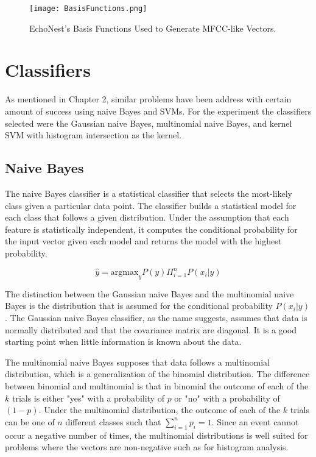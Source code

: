 \begin{figure}[h!]
  \centering
      \texttt{[image: BasisFunctions.png]}
  \caption[Compact Routing Example]%
    {EchoNest's Basis Functions Used to Generate MFCC-like Vectors.\protect\footnotemark}

  \end{figure}


\section*{Classifiers}

As mentioned in Chapter 2, similar problems have been address with
certain amount of success using naive Bayes and SVMs. For the experiment the 
classifiers selected were the Gaussian naive Bayes, multinomial naive Bayes, and 
kernel SVM with histogram intersection as the kernel. 

\subsection*{Naive Bayes}

The naive Bayes classifier is a statistical classifier that selects the most-likely 
class given a particular data point. The classifier builds a statistical model for each class that 
follows a given distribution. Under the assumption that each
feature is statistically independent, it computes the conditional probability for 
the input vector given each model and returns the model with the highest probability.


\begin{equation}
\hat{y} = \text{argmax}_{y} P(y) \Pi_{i=1}^{n} P(x_i|y)
\end{equation}

The distinction between the Gaussian naive Bayes and the multinomial naive Bayes is the 
distribution that is assumed for the conditional probability $P(x_i | y)$.  The Gaussian naive
Bayes classifier, as the name suggests, assumes that data is normally distributed and 
that the covariance matrix are diagonal. It is a good starting point when little information is known about the data. 

The multinomial naive Bayes supposes that data follows a multinomial distribution, which is a generalization 
of the binomial distribution.  The difference between binomial and multinomial is that in binomial the outcome 
of each of the $k$ trials is either "yes" with a probability of $p$ or "no" with a probability of $(1-p)$. Under the multinomial
distribution, the outcome of each of the $k$ trials can be one of $n$ different classes such that $\sum^n_{i=1}p_i = 1$.
Since an event cannot occur a negative number of times, the multinomial distributions is well suited for problems where 
the vectors are non-negative such as for histogram analysis. 

